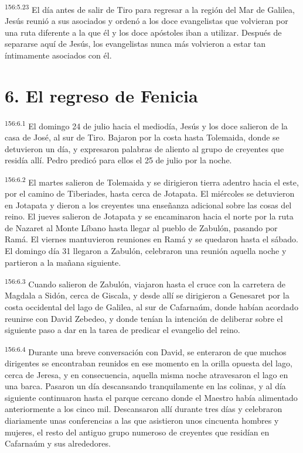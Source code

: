 \par 
\textsuperscript{156:5.23} El día antes de salir de Tiro para regresar a la región del Mar de Galilea, Jesús reunió a sus asociados y ordenó a los doce evangelistas que volvieran por una ruta diferente a la que él y los doce apóstoles iban a utilizar. Después de separarse aquí de Jesús, los evangelistas nunca más volvieron a estar tan íntimamente asociados con él.

\section*{6. El regreso de Fenicia}
\par 
\textsuperscript{156:6.1} El domingo 24 de julio hacia el mediodía, Jesús y los doce salieron de la casa de José, al sur de Tiro. Bajaron por la costa hasta Tolemaida, donde se detuvieron un día, y expresaron palabras de aliento al grupo de creyentes que residía allí. Pedro predicó para ellos el 25 de julio por la noche.

\par 
\textsuperscript{156:6.2} El martes salieron de Tolemaida y se dirigieron tierra adentro hacia el este, por el camino de Tiberiades, hasta cerca de Jotapata. El miércoles se detuvieron en Jotapata y dieron a los creyentes una enseñanza adicional sobre las cosas del reino. El jueves salieron de Jotapata y se encaminaron hacia el norte por la ruta de Nazaret al Monte Líbano hasta llegar al pueblo de Zabulón, pasando por Ramá. El viernes mantuvieron reuniones en Ramá y se quedaron hasta el sábado. El domingo día 31 llegaron a Zabulón, celebraron una reunión aquella noche y partieron a la mañana siguiente.

\par 
\textsuperscript{156:6.3} Cuando salieron de Zabulón, viajaron hasta el cruce con la carretera de Magdala a Sidón, cerca de Giscala, y desde allí se dirigieron a Genesaret por la costa occidental del lago de Galilea, al sur de Cafarnaúm, donde habían acordado reunirse con David Zebedeo, y donde tenían la intención de deliberar sobre el siguiente paso a dar en la tarea de predicar el evangelio del reino.

\par 
\textsuperscript{156:6.4} Durante una breve conversación con David, se enteraron de que muchos dirigentes se encontraban reunidos en ese momento en la orilla opuesta del lago, cerca de Jeresa, y en consecuencia, aquella misma noche atravesaron el lago en una barca. Pasaron un día descansando tranquilamente en las colinas, y al día siguiente continuaron hasta el parque cercano donde el Maestro había alimentado anteriormente a los cinco mil. Descansaron allí durante tres días y celebraron diariamente unas conferencias a las que asistieron unos cincuenta hombres y mujeres, el resto del antiguo grupo numeroso de creyentes que residían en Cafarnaúm y sus alrededores.

